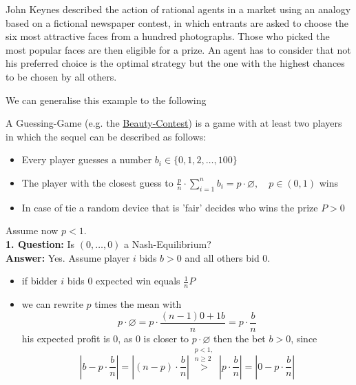 \begin{example}  \label{Beauty-Contest}
John Keynes described the action of rational agents in a market using an analogy based on a fictional newspaper contest, in which entrants are asked to choose the six most attractive faces from a hundred photographs. Those who picked the most popular faces are then eligible for a prize. An agent has to consider that not his preferred choice is the optimal strategy but the one with the highest chances to be chosen by all others.
\end{example}
We can generalise this example to the following \\
\begin{example}  \label{Guessing-Game}
	 A Guessing-Game (e.g. the \hyperref[Beauty-Contest]{Beauty-Contest}) is a game with at least two players in which the sequel can be described as follows:
	\begin{itemize}
		\item Every player guesses a number $b_{i} \in \{0, 1, 2, \dotsc, 100 \}$
		\item The player with the closest guess to $\frac{p}{n} \cdot \sum_{i = 1}^{n} b_{i} = p \cdot \varnothing, \quad p \in (0, 1)$ wins
		\item In case of tie a random device that is 'fair' decides who wins the prize $P > 0$
	\end{itemize}
	Assume now $p < 1$. \\
	\textbf{1. Question:} Is $(0, \dotsc, 0)$ a Nash-Equilibrium? \\
	\textbf{Answer:} Yes. Assume player $i$ bids $b > 0$ and all others bid $0$.	
		\begin{itemize}
			\item if bidder $i$ bids $0$ expected win equals $\frac{1}{n} P $
			\item we can rewrite $p$ times the mean with	
				\[ p \cdot \varnothing = p \cdot \frac{(n - 1)0 + 1 b}{n} = p \cdot \frac{b}{n} \]
			his expected profit is $0$, as $0$ is closer to $p \cdot \varnothing$ then the bet $b > 0$, since
			\[ \left| b - p \cdot \frac{b}{n} \right| =  \left|(n-p) \cdot \frac{b}{n} \right| \overset{\substack{p < 1, \\ n \geq 2}}{>} \left| p \cdot \frac{b}{n} \right| = \left| 0 - p \cdot \frac{b}{n} \right| \]
		\end{itemize}
	

\end{example}
